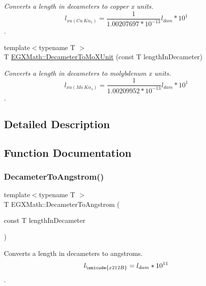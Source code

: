\begin{DoxyCompactItemize}
\begin{DoxyCompactList}\small\item\em Converts a length in decameters to copper x units. \[ l_{xu(Cu\ K\alpha_1)}= \frac{1}{1.00207697*10^{-13}} l_{dam} * 10^{1}\]. \end{DoxyCompactList}\item 
{\footnotesize template$<$typename T $>$ }\\T \mbox{\hyperlink{group___e_g_x_math-_conversions-_length_conversions-_s_i-_decameter-_non-_s_i_ga9e345feeb2568ded9fdceaf1d23d0ca6}{E\+G\+X\+Math\+::\+Decameter\+To\+Mo\+X\+Unit}} (const T length\+In\+Decameter)
\begin{DoxyCompactList}\small\item\em Converts a length in decameters to molybdenum x units. \[ l_{xu(Mo\ K\alpha_1)}=\frac{1}{1.00209952*10^{-13}} l_{dam} * 10^{1}\]. \end{DoxyCompactList}\end{DoxyCompactItemize}


\subsection{Detailed Description}


\subsection{Function Documentation}
\mbox{\label{group___e_g_x_math-_conversions-_length_conversions-_s_i-_decameter-_non-_s_i_ga2ea722ea1c773432c2680fe6ebd67638}} 
\subsubsection{\texorpdfstring{Decameter\+To\+Angstrom()}{DecameterToAngstrom()}}
{\footnotesize\ttfamily template$<$typename T $>$ \\
T E\+G\+X\+Math\+::\+Decameter\+To\+Angstrom (\begin{DoxyParamCaption}\item[{const T}]{length\+In\+Decameter }\end{DoxyParamCaption})}



Converts a length in decameters to angstroms. \[ l_{\unicode{x212B}}=l_{dam} * 10^{11} \]. 

